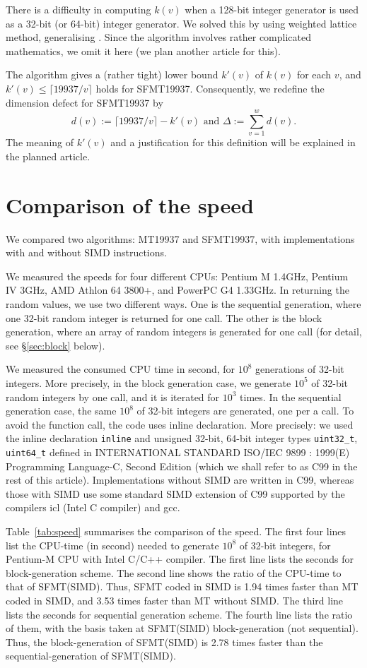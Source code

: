 \documentclass[acmnow]{acmtrans2m}
\begin{document}
There is a difficulty in computing $k(v)$ when 
a 128-bit integer generator is used as a 32-bit 
(or 64-bit) integer generator.
We solved this by using weighted lattice method,
generalising \cite{CLT}. Since the algorithm involves
rather complicated mathematics, we omit it here
(we plan another article for this). 

The algorithm gives a (rather tight) 
lower bound $k'(v)$ of $k(v)$ for each $v$, 
and $k'(v) \leq \lceil 19937/v \rceil$ holds
for SFMT19937.
Consequently, we redefine the dimension defect for SFMT19937 by
$$
d(v):=\lceil 19937/v \rceil - k'(v) 
\mbox{ and } \Delta:=\sum_{v=1}^w d(v).
$$
The meaning of $k'(v)$ and a justification for this 
definition will be explained in the planned article.

\section{Comparison of the speed}\label{sec:comp-speed}
We compared two algorithms: MT19937 and SFMT19937,
with implementations with and without SIMD instructions.

We measured the speeds for four different CPUs:
Pentium M 1.4GHz, Pentium IV 3GHz, 
AMD Athlon 64 3800+, and PowerPC G4 1.33GHz.  
In returning the random values, we use two different ways.
One is the sequential generation, where one 32-bit random 
integer is returned for one call. 
The other is the block generation, where an array
of random integers is generated for one call (for 
detail, see \S\ref{sec:block} below). 

We measured the consumed CPU time in second, 
for $10^8$ generations of 32-bit integers. More precisely,
in the block generation case, we generate $10^5$
of 32-bit random integers by one call, and it is iterated
for $10^3$ times. 
In the sequential generation case, the same $10^8$
of 32-bit integers are generated, one per a call.
To avoid the function call, the code uses 
inline declaration. 
More precisely: we used the inline declaration
{\tt inline}
and unsigned 32-bit, 64-bit integer types 
{\tt uint32\_t}, {\tt uint64\_t} defined in 
INTERNATIONAL STANDARD ISO/IEC 9899 : 1999(E) 
Programming Language-C, Second Edition
(which we shall refer to as C99 in the rest of this article).
Implementations without SIMD are written in C99,
whereas those with SIMD use
some standard SIMD extension of C99 supported by 
the compilers icl (Intel C compiler) and gcc.

Table~\ref{tab:speed} summarises the comparison of 
the speed. The first four lines list the CPU-time
(in second) needed to generate $10^8$ of
32-bit integers, for Pentium-M CPU with Intel C/C++
compiler. The first line lists the seconds for
block-generation scheme. The second line shows the 
ratio of the CPU-time to that of 
SFMT(SIMD). Thus, SFMT coded in SIMD is 1.94 times
faster than MT coded in SIMD, and 3.53 times faster
than MT without SIMD. The third line lists the seconds
for sequential generation scheme. The fourth line
lists the ratio of them, with the basis taken
at SFMT(SIMD) block-generation (not sequential). 
Thus, the block-generation of SFMT(SIMD) is 2.78 times
faster than the sequential-generation of SFMT(SIMD).
\end{document}

